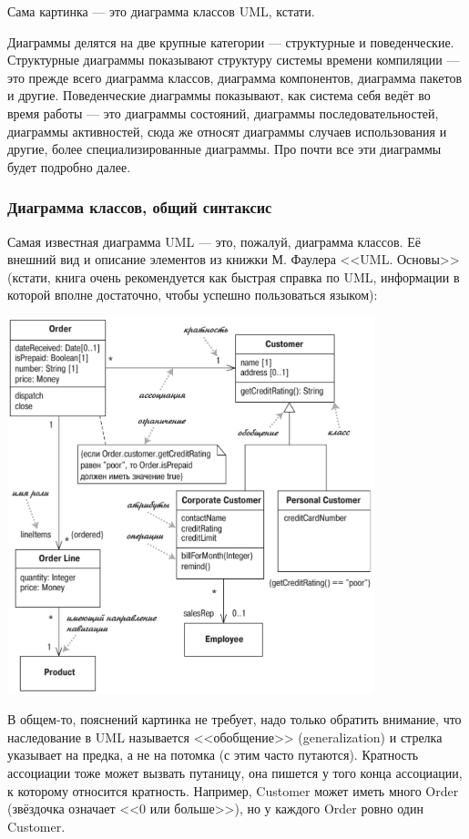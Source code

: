 \documentclass{../../text-style}
\begin{document}
Сама картинка --- это диаграмма классов UML, кстати.

Диаграммы делятся на две крупные категории --- структурные и поведенческие. Структурные диаграммы показывают структуру системы времени компиляции --- это прежде всего диаграмма классов, диаграмма компонентов, диаграмма пакетов и другие. Поведенческие диаграммы показывают, как система себя ведёт во время работы --- это диаграммы состояний, диаграммы последовательностей, диаграммы активностей, сюда же относят диаграммы случаев использования и другие, более специализированные диаграммы. Про почти все эти диаграммы будет подробно далее.

\subsubsection{Диаграмма классов, общий синтаксис}

Самая известная диаграмма UML --- это, пожалуй, диаграмма классов. Её внешний вид и описание элементов из книжки М. Фаулера <<UML. Основы>> (кстати, книга очень рекомендуется как быстрая справка по UML, информации в которой вполне достаточно, чтобы успешно пользоваться языком):

\begin{center}
    \includegraphics[width=0.8\textwidth]{umlClassDiagram.png}
\end{center}

В общем-то, пояснений картинка не требует, надо только обратить внимание, что наследование в UML называется <<обобщение>> (generalization) и стрелка указывает на предка, а не на потомка (с этим часто путаются). Кратность ассоциации тоже может вызвать путаницу, она пишется у того конца ассоциации, к которому относится кратность. Например, Customer может иметь много Order (звёздочка означает <<0 или больше>>), но у каждого Order ровно один Customer. 
\end{document}
